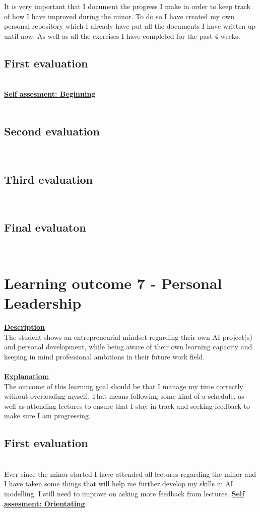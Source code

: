 \documentclass{article}
\begin{document}
It is very important that I document the progress I make in order to keep track of how I have improved during the minor. To do so 
I have created my own personal repository which I already have put all the documents I have written up until now. As well as all the exercises 
I have completed for the past 4 weeks. 
\subsection{First evaluation}\\
\underline{\textbf{Self assesment: Beginning}}\\\\
\subsection{Second evaluation}\\
\subsection{Third evaluation}\\
\subsection{Final evaluaton}\\

\section{Learning outcome 7 - Personal Leadership}
\underline{\textbf{Description}}\\
The student shows an entrepreneurial mindset regarding their own AI project(s) and personal development, while being aware
of their own learning capacity and keeping in mind professional ambitions in their future work field.\\\\
\underline{\textbf{Explanation:}}\\
The outcome of this learning goal should be that I manage my time correctly without overloading myself. That means following some kind of a schedule, 
as well as attending lectures to ensure that I stay in track and seeking feedback to make sure I am progressing.
\subsection{First evaluation}\\
Ever since the minor started I have attended all lectures regarding the minor and I have taken some things that will help me further develop my skills in AI modelling. 
I still need to improve on asking more feedback from lectures.
\underline{\textbf{Self assesment: Orientating}}\\\\
\end{document}
